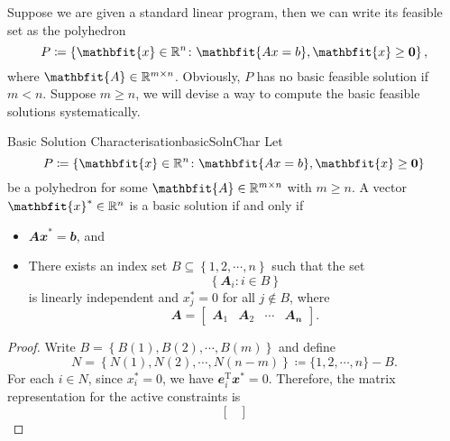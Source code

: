 \documentclass[math, code]{amznotes}
\theoremstyle{remark}
\begin{document}
Suppose we are given a standard linear program, then we can write its feasible set as the polyhedron
\begin{equation*}
    P \coloneqq \left\{\mathbfit{x} \in \R^n \colon \mathbfit{Ax = b}, \mathbfit{x} \geq \mathbf{0}\right\},
\end{equation*}
where $\mathbfit{A} \in \R^{m \times n}$. Obviously, $P$ has no basic feasible solution if $m < n$. Suppose $m \geq n$, we will devise a way to compute the basic feasible solutions systematically.
\begin{thmbox}{Basic Solution Characterisation}{basicSolnChar}
    Let 
    \begin{equation*}
        P \coloneqq \left\{\mathbfit{x} \in \R^n \colon \mathbfit{Ax = b}, \mathbfit{x} \geq \mathbf{0}\right\}
    \end{equation*}
    be a polyhedron for some $\mathbfit{A} \in \R^{m \times n}$ with $m \geq n$. A vector $\mathbfit{x}^* \in \R^n$ is a basic solution if and only if
    \begin{itemize}
        \item $\mathbfit{Ax}^* = \mathbfit{b}$, and
        \item There exists an index set $B \subseteq \left\{1, 2, \cdots, n\right\}$ such that the set
        \begin{equation*}
            \left\{\mathbfit{A}_i \colon i \in B\right\}
        \end{equation*}
        is linearly independent and $x^*_j = 0$ for all $j \notin B$, where
        \begin{equation*}
            \mathbfit{A} = \begin{bmatrix}
                \mathbfit{A_1} & \mathbfit{A_2} & \cdots & \mathbfit{A_n}
            \end{bmatrix}.
        \end{equation*}
    \end{itemize}
    \tcblower
    \begin{proof}
        Write $B = \left\{B(1), B(2), \cdots, B(m)\right\}$ and define 
        \begin{equation*}
            N = \left\{N(1), N(2), \cdots, N(n - m)\right\} \coloneqq \{1, 2, \cdots, n\} - B.
        \end{equation*}
        For each $i \in N$, since $x^*_i = 0$, we have $\mathbfit{e}^{\mathrm{T}}_i\mathbfit{x}^* = 0$. Therefore, the matrix representation for the active constraints is
        \begin{equation*}
            \begin{bmatrix}

\end{bmatrix}
\end{equation*}
\end{proof}
\end{thmbox}
\end{document}

